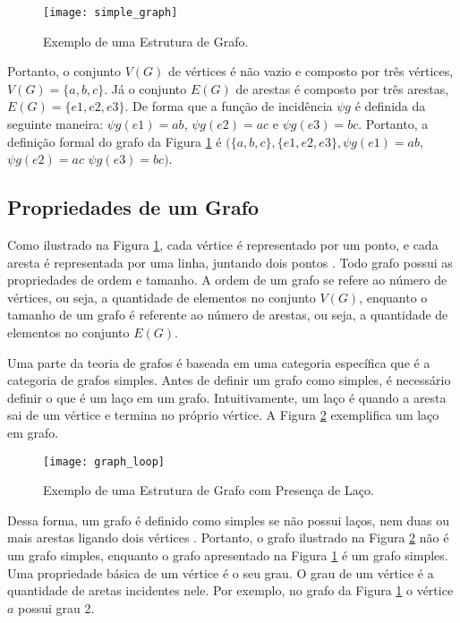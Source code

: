 \begin{figure}[H]
	\centering
    \texttt{[image: simple\_graph]}
    \caption{Exemplo de uma Estrutura de Grafo.}
    \label{graph_definition}
\end{figure}

	Portanto, o conjunto \(V(G)\) de vértices é não vazio e composto por três vértices, \(V(G)=\{a,b,c\}\). Já o conjunto \(E(G)\) de arestas é composto por três arestas, \(E(G)=\{e1,e2,e3\}\). De forma que a função de incidência \(\psi g\) é definida da seguinte maneira: \(\psi g(e1)= ab\), \(\psi g(e2)= ac\) e \(\psi g(e3)= bc\). Portanto, a definição formal do grafo da Figura \ref{graph_definition} é \((\{a,b,c\}, \{e1,e2,e3\}, \psi g(e1)= ab\), \(\psi g(e2)= ac\) \(\psi g(e3)= bc)\).
	
\subsection{Propriedades de um Grafo}
	Como ilustrado na Figura \ref{graph_definition}, cada vértice é representado por um ponto, e cada aresta é representada por uma linha, juntando dois pontos \cite{bondy1976graph}. Todo grafo possui as propriedades de ordem e tamanho. A ordem de um grafo se refere ao número de vértices, ou seja, a quantidade de elementos no conjunto \(V(G)\), enquanto o tamanho de um grafo é referente ao número de arestas, ou seja, a quantidade de elementos no conjunto \(E(G)\).
	
	Uma parte da teoria de grafos é baseada em uma categoria específica que é a categoria de grafos simples. Antes de definir um grafo como simples, é necessário definir o que é um laço em um grafo. Intuitivamente, um laço é quando a aresta sai de um vértice e termina no próprio vértice. A Figura \ref{graph_loop} exemplifica um laço em grafo.

\begin{figure}[H]
	\centering
    \texttt{[image: graph\_loop]}
    \caption{Exemplo de uma Estrutura de Grafo com Presença de Laço.}
    \label{graph_loop}
\end{figure}

	Dessa forma, um grafo é definido como simples se não possui laços, nem duas ou mais arestas ligando dois vértices \cite{bondy1976graph}. Portanto, o grafo ilustrado na Figura \ref{graph_loop} não é um grafo simples, enquanto o grafo apresentado na Figura \ref{graph_definition} é um grafo simples. Uma propriedade básica de um vértice é o seu grau. O grau de um vértice é a quantidade de aretas incidentes nele. Por exemplo, no grafo da Figura \ref{graph_definition} o vértice \(a\) possui grau 2.
	
